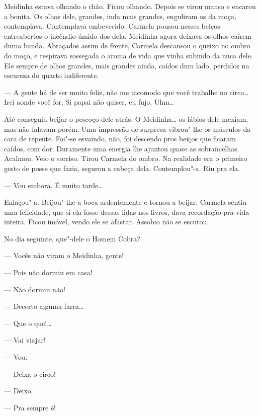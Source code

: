 Meidinha estava olhando o chão. Ficou olhando. Depois se virou manso e
encarou a bonita. Os olhos dele, grandes, inda mais grandes, enguliram
os da moça, contemplava. Contemplava embevecido. Carmela pousou nesses
beiços entreabertos o incêndio úmido dos dela. Meidinha agora deixava os
olhos caírem duma banda. Abraçados assim de frente, Carmela descansou o
queixo no ombro do moço, e respirava sossegada o aroma de vida que vinha
subindo da nuca dele. Ele sempre de olhos grandes, mais grandes ainda,
caídos dum lado, perdidos na escureza do quarto indiferente.

--- A gente há de ser muito feliz, não me incomodo que você trabalhe no
circo\ldots{} Irei aonde você for. Si papai não quiser, eu fujo. Uhm\ldots{}

Até conseguiu beijar o pescoço dele atrás. O Meidinha\ldots{} os lábios dele
mexiam, mas não falavam porém. Uma impressão de surpresa vibrou"-lhe os
músculos da cara de repente. Foi"-se esvaindo, não, foi descendo pros
beiços que ficaram caídos, com dor. Duramente uma energia lhe ajuntou
quase as sobrancelhas. Acalmou. Veio o sorriso. Tirou Carmela do ombro.
Na realidade era o primeiro gesto de posse que fazia, segurou a cabeça
dela. Contemplou"-a. Riu pra ela.

--- Vou embora. É muito tarde\ldots{}

Enlaçou"-a. Beijou"-lhe a boca ardentemente e tornou a beijar. Carmela
sentiu uma felicidade, que si ela fosse dessas lidas nos livros, dava
recordação pra vida inteira. Ficou imóvel, vendo ele se afastar. Assobio
não se escutou.

No dia seguinte, que"-dele o Homem Cobra?

--- Vocês não viram o Meidinha, gente!

--- Pois não dormiu em casa!

--- Não dormiu não!

--- Decerto alguma farra\ldots{}

--- Que o que!\ldots{}


--- Vai viajar!

--- Vou.

--- Deixa o circo!

--- Deixo.

--- Pra sempre é!

